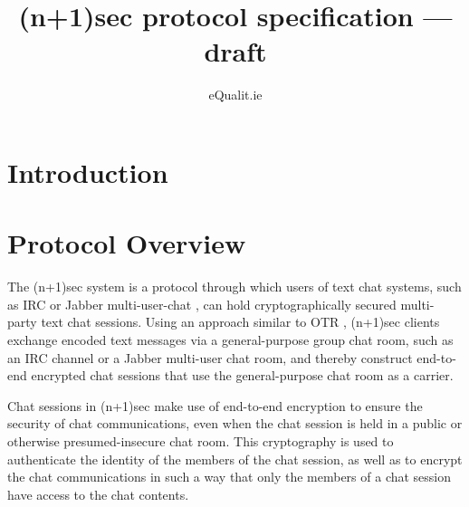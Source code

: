 \documentclass{article}
\title{(n+1)sec protocol specification --- draft}
\author{eQualit.ie}
\begin{document}
\maketitle

\section{Introduction}
\label{sec:introduction}











\section{Protocol Overview}
\label{sec:protocol-overview}

The (n+1)sec system is a protocol through which users of text chat systems, such as IRC \cite{irc} or Jabber multi-user-chat \cite{jabber}, can hold cryptographically secured multi-party text chat sessions.
Using an approach similar to OTR \cite{otr}, (n+1)sec clients exchange encoded text messages via a general-purpose group chat room, such as an IRC channel or a Jabber multi-user chat room, and thereby construct end-to-end encrypted chat sessions that use the general-purpose chat room as a carrier.

Chat sessions in (n+1)sec make use of end-to-end encryption to ensure the security of chat communications, even when the chat session is held in a public or otherwise presumed-insecure chat room.
This cryptography is used to authenticate the identity of the members of the chat session, as well as to encrypt the chat communications in such a way that only the members of a chat session have access to the chat contents.
\end{document}
